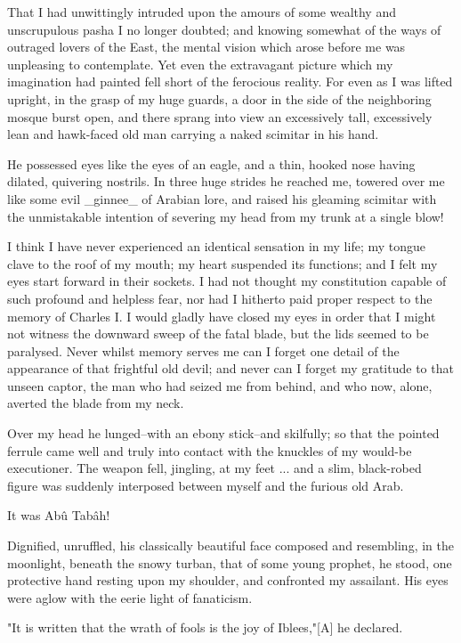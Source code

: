 That I had unwittingly intruded upon the amours of some wealthy and
unscrupulous pasha I no longer doubted; and knowing somewhat of the
ways of outraged lovers of the East, the mental vision which arose
before me was unpleasing to contemplate. Yet even the extravagant
picture which my imagination had painted fell short of the ferocious
reality. For even as I was lifted upright, in the grasp of my huge
guards, a door in the side of the neighboring mosque burst open, and
there sprang into view an excessively tall, excessively lean and
hawk-faced old man carrying a naked scimitar in his hand.

He possessed eyes like the eyes of an eagle, and a thin, hooked nose
having dilated, quivering nostrils. In three huge strides he reached
me, towered over me like some evil _ginnee_ of Arabian lore, and
raised his gleaming scimitar with the unmistakable intention of
severing my head from my trunk at a single blow!

I think I have never experienced an identical sensation in my life;
my tongue clave to the roof of my mouth; my heart suspended its
functions; and I felt my eyes start forward in their sockets. I had
not thought my constitution capable of such profound and helpless
fear, nor had I hitherto paid proper respect to the memory of Charles
I. I would gladly have closed my eyes in order that I might not
witness the downward sweep of the fatal blade, but the lids seemed to
be paralysed. Never whilst memory serves me can I forget one detail of
the appearance of that frightful old devil; and never can I forget my
gratitude to that unseen captor, the man who had seized me from
behind, and who now, alone, averted the blade from my neck.

Over my head he lunged--with an ebony stick--and skilfully; so that
the pointed ferrule came well and truly into contact with the knuckles
of my would-be executioner. The weapon fell, jingling, at my feet ...
and a slim, black-robed figure was suddenly interposed between myself
and the furious old Arab.

It was Abû Tabâh!

Dignified, unruffled, his classically beautiful face composed and
resembling, in the moonlight, beneath the snowy turban, that of some
young prophet, he stood, one protective hand resting upon my shoulder,
and confronted my assailant. His eyes were aglow with the eerie light
of fanaticism.

"It is written that the wrath of fools is the joy of Iblees,"[A] he
declared.

